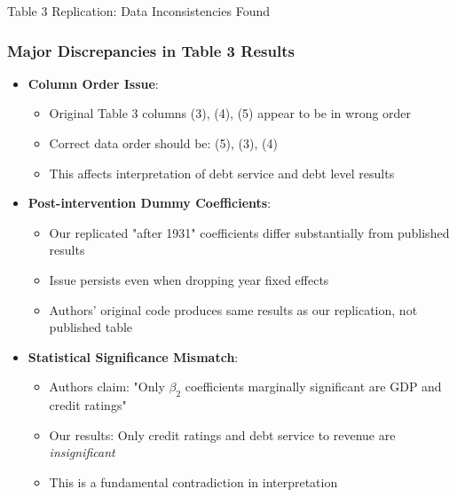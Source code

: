 \documentclass{beamer}
\begin{document}
\begin{frame}{Table 3 Replication: Data Inconsistencies Found}
  \frametitle{Major Discrepancies in Table 3 Results}
  \begin{itemize}
    \item \textbf{Column Order Issue}:
    \begin{itemize}
        \item Original Table 3 columns (3), (4), (5) appear to be in wrong order
        \item Correct data order should be: (5), (3), (4)
        \item This affects interpretation of debt service and debt level results
    \end{itemize}
    \item \textbf{Post-intervention Dummy Coefficients}:
    \begin{itemize}
        \item Our replicated "after 1931" coefficients differ substantially from published results
        \item Issue persists even when dropping year fixed effects
        \item \alert{Authors' original code produces same results as our replication, not published table}
    \end{itemize}
    \item \textbf{Statistical Significance Mismatch}:
    \begin{itemize}
        \item Authors claim: "Only $\beta_2$ coefficients marginally significant are GDP and credit ratings"
        \item Our results: Only credit ratings and debt service to revenue are \textit{insignificant}
        \item This is a fundamental contradiction in interpretation
    \end{itemize}
  \end{itemize}
\end{frame}
\end{document}
